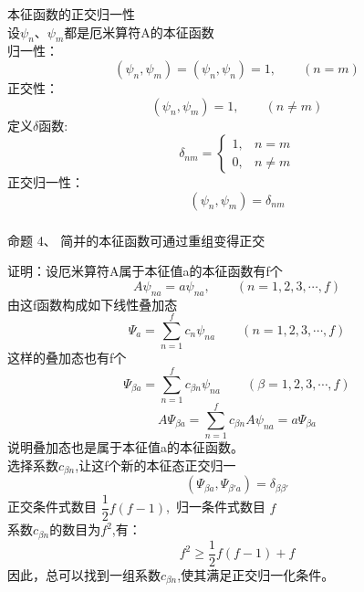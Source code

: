 \begin{frame} [allowframebreaks=]
    \frametitle{}
    \alert{本征函数的正交归一性}\\
    设$\psi_n$、$\psi_m$都是厄米算符A的本征函数\\
    归一性：
    \begin{equation*}
        (\psi_n, \psi_m)=(\psi_n, \psi_n)=1, \qquad (n=m)
    \end{equation*}  
    正交性：
    \begin{equation*}
        (\psi_n, \psi_m)=1, \qquad (n\neq m)
    \end{equation*}
    定义$\delta$函数:
    \begin{equation*}
        \delta_{n m}= 
        \begin{cases}1, & n=m \\ 
            0, & n \neq m
        \end{cases}
        \end{equation*}
    正交归一性：
    \begin{equation*}
        (\psi_n, \psi_m)=\delta_{nm}
    \end{equation*}
\end{frame} 

\begin{frame} [allowframebreaks=]
    \frametitle{}
    \begin{tcolorbox1}{命题 4、}
       简并的本征函数可通过重组变得正交
     \end{tcolorbox1}
    \alert{证明：}设厄米算符A属于本征值a的本征函数有f个
    \begin{equation*}
        A\psi_{na}=a\psi_{na}, \qquad (n=1,2,3,\cdots, f)
    \end{equation*}  
    由这f函数构成如下线性叠加态
    \begin{equation*}
        \Psi_a=\sum_{n=1}^{f} c_n \psi_{na} \qquad (n=1,2,3,\cdots, f)
    \end{equation*}
    这样的叠加态也有f个
    \begin{equation*}
        \Psi_{\beta a}=\sum_{n=1}^{f} c_{\beta n} \psi_{na} \qquad (\beta=1,2,3,\cdots, f)
    \end{equation*}
    \begin{equation*}
        A\Psi_{\beta a}=\sum_{n=1}^{f} c_{\beta n} A\psi_{na} =a \Psi_{\beta a}
    \end{equation*}
   说明叠加态也是属于本征值a的本征函数。\\
   选择系数$c_{\beta n}$,让这f个新的本征态正交归一
   \begin{equation*}
    (\Psi_{\beta a}, \Psi_{\beta' a})=\delta_{\beta\beta'}
    \end{equation*}
    正交条件式数目 $\dfrac{1}{2}f(f-1)$, 归一条件式数目 $f$\\
    系数$c_{\beta n}$的数目为$f^2$,有：$$ f^2\ge \dfrac{1}{2}f(f-1)+f$$
    因此，总可以找到一组系数$c_{\beta n}$,使其满足正交归一化条件。
\end{frame} 

